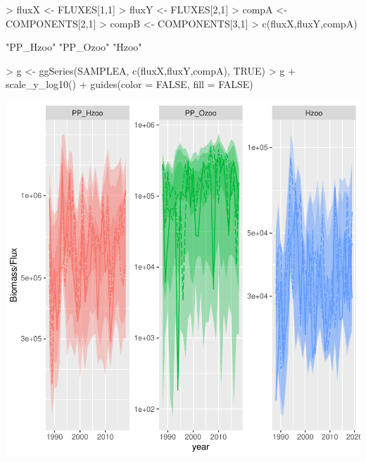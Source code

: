 \documentclass{article}
\begin{document}
\begin{Schunk}
\begin{Sinput}
> fluxX <- FLUXES[1,1]
> fluxY <- FLUXES[2,1]
> compA <- COMPONENTS[2,1] 
> compB <- COMPONENTS[3,1] 
> c(fluxX,fluxY,compA)
\end{Sinput}
\begin{Soutput}
[1] "PP_Hzoo" "PP_Ozoo" "Hzoo"   
\end{Soutput}
\begin{Sinput}
> g <- ggSeries(SAMPLEA, c(fluxX,fluxY,compA), TRUE)
> g + scale_y_log10() + guides(color = FALSE, fill = FALSE)
\end{Sinput}
\end{Schunk}
\includegraphics{barents_SM-026}
\end{document}
